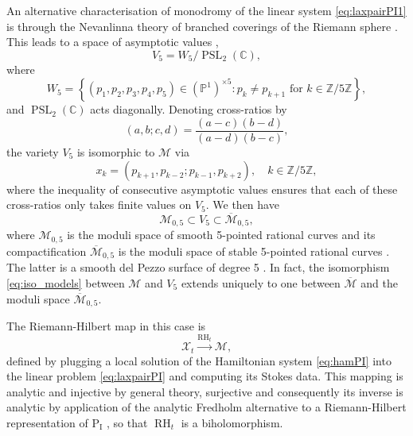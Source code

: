 \documentclass[a4paper,reqno]{amsart}
\numberwithin{equation}{section}
\newcommand\Pone{\textrm{P}_{\textrm{I}} }
\newcommand{\Z}{\mathbb{Z}}
\newcommand{\C}{\mathbb{C}}
\newcommand{\p}{\mathbb{P}}
\numberwithin{equation}{section}
\begin{document}
An alternative characterisation of monodromy of the linear system \eqref{eq:laxpairPI1} is through the Nevanlinna theory of branched coverings of the Riemann sphere \cites{nevanlinna32,elfving1934}. This leads to a space of asymptotic values \cite{masoerobethe},
\begin{equation*}
    V_5=W_5/\operatorname{PSL}_2(\C),
\end{equation*}
where
\begin{equation*}
    W_5=\left\{ (p_1,p_2,p_3,p_4,p_5)\in (\p^1)^{\times 5}: p_k\neq p_{k+1} \text{ for $k\in\mathbb{Z}/5\Z$} \right\},
\end{equation*}
and $\operatorname{PSL}_2(\C)$ acts diagonally. Denoting cross-ratios by
\begin{equation*}
    (a,b;c,d)=\frac{(a-c)(b-d)}{(a-d)(b-c)},
\end{equation*}
the variety $V_5$ is isomorphic to $\mathcal{M}$ via
\begin{equation}\label{eq:iso_models}
    x_k=(p_{k+1},p_{k-2};p_{k-1},p_{k+2}),\quad k\in\mathbb{Z}/5\Z,
\end{equation}
where the inequality of consecutive asymptotic values ensures that each of these cross-ratios only takes finite values on $V_5$. We then have
\begin{equation*}
    \mathcal{M}_{0,5}\subset V_5\subset \overline{\mathcal{M}}_{0,5},
\end{equation*}
where $\mathcal{M}_{0,5}$ is the moduli space of smooth 5-pointed rational curves and its compactification $\overline{\mathcal{M}}_{0,5}$ is the moduli space of stable 5-pointed rational curves \cite{knudsen}. The latter is a smooth del Pezzo surface of degree 5 \cite[Sec. 4.3]{kapranov}. In fact, the isomorphism \eqref{eq:iso_models} between $\mathcal{M}$ and $V_5$ extends uniquely to one between $\overline{\mathcal{M}}$
and the moduli space $\overline{\mathcal{M}}_{0,5}$.


The Riemann-Hilbert map in this case is 
\begin{equation*}
    \mathcal{X}_t \xrightarrow{\operatorname{RH}_t} \mathcal{M},
\end{equation*}
defined by plugging a local solution of the Hamiltonian system \eqref{eq:hamPI} into the linear problem \eqref{eq:laxpairPI} and computing its Stokes data. This mapping is analytic and injective by general theory,
surjective \cites{kk,piwkb} and consequently its inverse is analytic by application of the analytic Fredholm alternative to a Riemann-Hilbert representation of $\Pone$ \cite{fokas}, so that $\operatorname{RH}_t$ is a biholomorphism.
\end{document}
